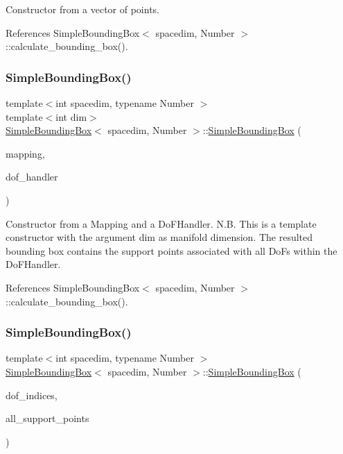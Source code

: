 Constructor from a vector of points. 

References Simple\+Bounding\+Box$<$ spacedim, Number $>$\+::calculate\+\_\+bounding\+\_\+box().

\mbox{\label{classSimpleBoundingBox_a41f4805f49de9e15c82063927dd7ef10}} 
\subsubsection{\texorpdfstring{Simple\+Bounding\+Box()}{SimpleBoundingBox()}\hspace{0.1cm}{\footnotesize\ttfamily [5/7]}}
{\footnotesize\ttfamily template$<$int spacedim, typename Number $>$ \\
template$<$int dim$>$ \\
\hyperlink{classSimpleBoundingBox}{Simple\+Bounding\+Box}$<$ spacedim, Number $>$\+::\hyperlink{classSimpleBoundingBox}{Simple\+Bounding\+Box} (\begin{DoxyParamCaption}\item[{const Mapping$<$ dim, spacedim $>$ \&}]{mapping,  }\item[{const Do\+F\+Handler$<$ dim, spacedim $>$ \&}]{dof\+\_\+handler }\end{DoxyParamCaption})}

Constructor from a {\ttfamily Mapping} and a {\ttfamily Do\+F\+Handler}. N.\+B. This is a template constructor with the argument dim as manifold dimension. The resulted bounding box contains the support points associated with all Do\+Fs within the Do\+F\+Handler. 

References Simple\+Bounding\+Box$<$ spacedim, Number $>$\+::calculate\+\_\+bounding\+\_\+box().

\mbox{\label{classSimpleBoundingBox_ab2568fcda9400b730d326574fa6ef58c}} 
\subsubsection{\texorpdfstring{Simple\+Bounding\+Box()}{SimpleBoundingBox()}\hspace{0.1cm}{\footnotesize\ttfamily [6/7]}}
{\footnotesize\ttfamily template$<$int spacedim, typename Number $>$ \\
\hyperlink{classSimpleBoundingBox}{Simple\+Bounding\+Box}$<$ spacedim, Number $>$\+::\hyperlink{classSimpleBoundingBox}{Simple\+Bounding\+Box} (\begin{DoxyParamCaption}\item[{const std\+::vector$<$ types\+::global\+\_\+dof\+\_\+index $>$ \&}]{dof\+\_\+indices,  }\item[{const std\+::vector$<$ Point$<$ spacedim, Number $>$$>$ \&}]{all\+\_\+support\+\_\+points }\end{DoxyParamCaption})}


